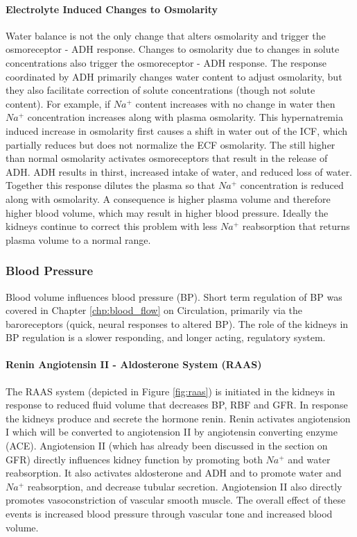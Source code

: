 \paragraph{Electrolyte Induced Changes to Osmolarity}
Water balance is not the only change that alters osmolarity and trigger the osmoreceptor - ADH response. Changes to osmolarity due to changes in solute concentrations also trigger the osmoreceptor - ADH response. The response coordinated by ADH primarily changes water content to adjust osmolarity, but they also facilitate correction of solute concentrations (though not solute content). For example, if $Na^+$ content increases with no change in water then $Na^+$ concentration increases along with plasma osmolarity. This hypernatremia induced increase in osmolarity first causes a shift in water out of the ICF, which partially reduces but does not normalize the ECF osmolarity. The still higher than normal osmolarity activates osmoreceptors that result in the release of ADH. ADH results in thirst, increased intake of water, and reduced loss of water. Together this response dilutes the plasma so that $Na^+$ concentration is reduced along with osmolarity. A consequence is higher plasma volume and therefore higher blood volume, which may result in higher blood pressure. Ideally the kidneys continue to correct this problem with less $Na^+$ reabsorption that returns plasma volume to a normal range.

\subsubsection{Blood Pressure}

Blood volume influences blood pressure (BP). Short term regulation of BP was covered in Chapter \ref{chp:blood_flow} on Circulation, primarily via the baroreceptors (quick, neural responses to altered BP). The role of the kidneys in BP regulation is a slower responding, and longer acting, regulatory system.

\paragraph{Renin Angiotensin II - Aldosterone System (RAAS)}

The RAAS system (depicted in Figure \ref{fig:raas}) is initiated in the kidneys in response to reduced fluid volume that decreases BP, RBF and GFR. In response the kidneys produce and secrete the hormone renin. Renin activates angiotension I which will be converted to angiotension II by angiotensin converting enzyme (ACE). Angiotension II (which has already been discussed in the section on GFR) directly influences kidney function by promoting both $Na^+$ and water reabsorption. It also activates aldosterone and ADH and to promote water and $Na^+$ reabsorption, and decrease tubular secretion. Angiotension II also directly promotes vasoconstriction of vascular smooth muscle. The overall effect of these events is increased blood pressure through vascular tone and increased blood volume.

